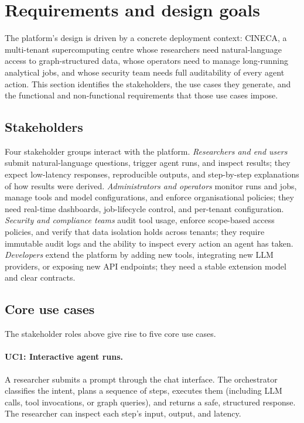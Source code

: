 \documentclass[a4paper,noexaminfo]{sapthesis}
\begin{document}
\section{Requirements and design goals}
\label{sec:requirements}

The platform's design is driven by a concrete deployment context: CINECA, a
multi-tenant supercomputing centre whose researchers need natural-language
access to graph-structured data, whose operators need to manage long-running
analytical jobs, and whose security team needs full auditability of every
agent action.  This section identifies the stakeholders, the use cases
they generate, and the functional and non-functional requirements that
those use cases impose.

\subsection{Stakeholders}

Four stakeholder groups interact with the platform.  \emph{Researchers and
end users} submit natural-language questions, trigger agent runs, and
inspect results; they expect low-latency responses, reproducible outputs,
and step-by-step explanations of how results were derived.
\emph{Administrators and operators} monitor runs and jobs, manage tools and
model configurations, and enforce organisational policies; they need
real-time dashboards, job-lifecycle control, and per-tenant configuration.
\emph{Security and compliance teams} audit tool usage, enforce scope-based
access policies, and verify that data isolation holds across tenants; they
require immutable audit logs and the ability to inspect every action
an agent has taken.  \emph{Developers} extend the platform by adding new
tools, integrating new LLM providers, or exposing new API endpoints; they
need a stable extension model and clear contracts.

\subsection{Core use cases}
\label{sec:use-cases}

The stakeholder roles above give rise to five core use cases.

\paragraph{UC1: Interactive agent runs.}
A researcher submits a prompt through the chat interface.  The orchestrator
classifies the intent, plans a sequence of steps, executes them (including
LLM calls, tool invocations, or graph queries), and returns a safe,
structured response.  The researcher can inspect each step's input, output,
and latency.
\end{document}
